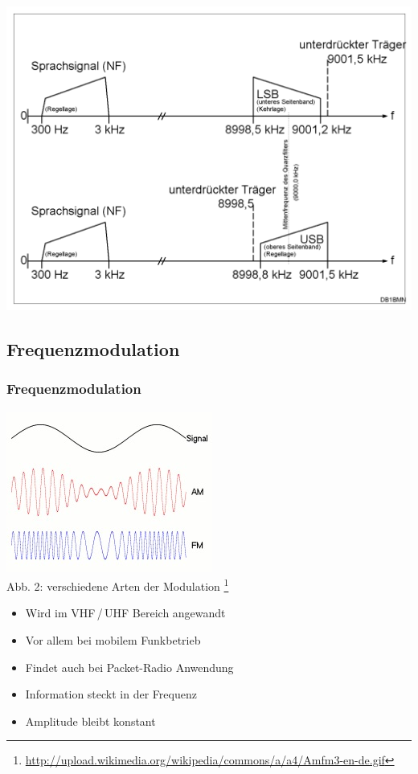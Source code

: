\begin{frame}
  \begin{center}
    \includegraphics[width=1\textwidth,height=1\textheight,keepaspectratio]{e16/Ssb-de.png}
    \tiny \hyperlink{refs}{\cite{wc}}
  \end{center}
\end{frame}

\subsection[FM]{Frequenzmodulation}
\begin{frame}
\frametitle{Frequenzmodulation}
	\begin{center}
\includegraphics[scale=0.7]{e14/modulationen.jpg}\\
	Abb. 2: verschiedene Arten der Modulation
	\footnote{\url{http://upload.wikimedia.org/wikipedia/commons/a/a4/Amfm3-en-de.gif}}\\
	\begin{itemize}
		\item Wird im VHF\,/\,UHF Bereich angewandt
		\item Vor allem bei mobilem Funkbetrieb
		\item Findet auch bei Packet-Radio Anwendung
		\item Information steckt in der Frequenz
		\item Amplitude bleibt konstant
	\end{itemize}
	\end{center}
\end{frame}

